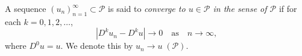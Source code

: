 A sequence $(u_n)_{n=1}^{\infty} \subset \mathcal{P}$ is said to \emph{converge to $u \in \mathcal{P}$ in the sense of $\mathcal{P}$} if for each $k = 0, 1, 2, \ldots$,
$$|D^k u_n - D^k u| \to 0 \quad \text{as} \quad n \to \infty,$$
where $D^0 u = u$. We denote this by $u_n \to u \; (\mathcal{P})$.

